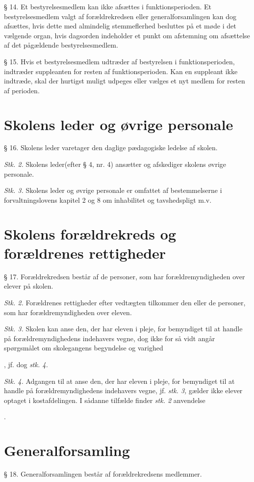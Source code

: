 \documentclass[11pt, a4paper]{article}
\begin{document}
§ 14. Et bestyrelsesmedlem kan ikke afsættes i funktionsperioden. Et bestyrelsesmedlem valgt af forældrekredsen eller generalforsamlingen kan dog afsættes, hvis dette med almindelig stemmeflerhed besluttes på et møde i det vælgende organ, hvis dagsorden indeholder et punkt om afstemning om afsættelse af det pågældende bestyrelsesmedlem.

§ 15. Hvis et bestyrelsesmedlem udtræder af bestyrelsen i funktionsperioden, indtræder suppleanten for resten af funktionsperioden. Kan en suppleant ikke indtræde, skal der hurtigst muligt udpeges eller vælges et nyt medlem for resten af perioden.

\section*{Skolens leder og øvrige personale}
§ 16. Skolens leder varetager den daglige pædagogiske ledelse af skolen.

\textit{Stk. 2.} Skolens leder(efter § 4, nr. 4) ansætter og afskediger skolens øvrige personale.

\textit{Stk. 3.} Skolens leder og øvrige personale er omfattet af bestemmelserne i forvaltningslovens kapitel 2 og 8 om inhabilitet og tavshedspligt m.v.


\section*{Skolens forældrekreds og forældrenes rettigheder}
§ 17. Forældrekredsen består af de personer, som har forældremyndigheden over elever på skolen.

\textit{Stk. 2.} Forældrenes rettigheder efter vedtægten tilkommer den eller de personer, som har forældremyndigheden over eleven.

\textit{Stk. 3.} Skolen kan anse den, der har eleven i pleje, for bemyndiget til at handle på forældremyndighedens indehavers vegne, dog ikke for så vidt angår spørgsmålet om skolegangens begyndelse og varighed{, jf. dog \textit{stk. 4.}

\textit{Stk. 4.} Adgangen til at anse den, der har eleven i pleje, for bemyndiget til at handle på forældremyndighedens indehavers vegne, jf. \textit{stk. 3,} gælder ikke elever optaget i kostafdelingen. I sådanne tilfælde finder \textit{stk. 2 }anvendelse}.


\section*{Generalforsamling}
§ 18. Generalforsamlingen består af forældrekredsens medlemmer.
\end{document}
